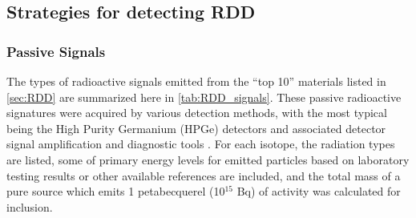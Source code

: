 \documentclass{report}
\begin{document}




\subsection{Strategies for detecting RDD}
 
\subsubsection{Passive Signals}

The types of radioactive signals emitted from the \enquote{top 10} materials listed in \autoref{sec:RDD} are summarized here in \autoref{tab:RDD_signals}.  These passive radioactive signatures were acquired by various detection methods, with the most typical being the High Purity Germanium (HPGe) detectors and associated detector signal amplification and diagnostic tools \cite{Glaser2007}.  For each isotope, the radiation types are listed, some of primary energy levels for emitted particles based on laboratory testing results or other available references are included, and the total mass of a pure source which emits 1 petabecquerel (10\(^{15}\) Bq) of activity was calculated for inclusion. 
\end{document}
